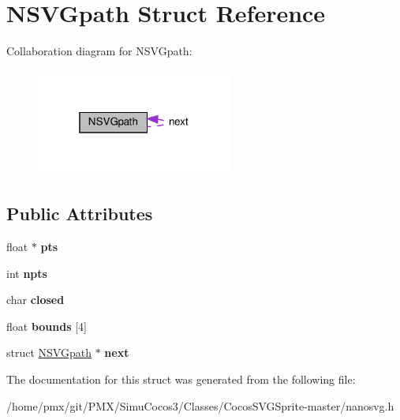 \hypertarget{structNSVGpath}{}\section{N\+S\+V\+Gpath Struct Reference}
\label{structNSVGpath}


Collaboration diagram for N\+S\+V\+Gpath\+:
\nopagebreak
\begin{figure}[H]
\begin{center}
\leavevmode
\includegraphics[width=184pt]{structNSVGpath__coll__graph}
\end{center}
\end{figure}
\subsection*{Public Attributes}
\begin{DoxyCompactItemize}
\item 
\mbox{\label{structNSVGpath_a156c192d254d562cf7a5c98b3adfca68}} 
float $\ast$ {\bfseries pts}
\item 
\mbox{\label{structNSVGpath_a45f685f06ac09e453f64b558c7b4562d}} 
int {\bfseries npts}
\item 
\mbox{\label{structNSVGpath_a23aa888bcee2377a97258eb8abe3cf3f}} 
char {\bfseries closed}
\item 
\mbox{\label{structNSVGpath_a204f5e7c7cd4e5bb95a2a36603a4bad4}} 
float {\bfseries bounds} \mbox{[}4\mbox{]}
\item 
\mbox{\label{structNSVGpath_a98bb47a9a0c1347b81285984e3606721}} 
struct \hyperlink{structNSVGpath}{N\+S\+V\+Gpath} $\ast$ {\bfseries next}
\end{DoxyCompactItemize}


The documentation for this struct was generated from the following file\+:\begin{DoxyCompactItemize}
\item 
/home/pmx/git/\+P\+M\+X/\+Simu\+Cocos3/\+Classes/\+Cocos\+S\+V\+G\+Sprite-\/master/nanosvg.\+h\end{DoxyCompactItemize}
